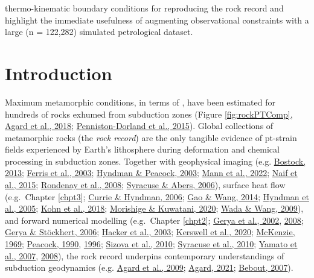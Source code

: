 thermo-kinematic boundary conditions for reproducing the rock record and highlight the immediate usefulness of augmenting observational constraints with a large (n = 122,282) simulated petrological dataset.

\hypertarget{chpt4Intro}{%
\section{Introduction}\label{chpt4Intro}}

Maximum metamorphic conditions, in terms of , have been estimated for hundreds of  rocks exhumed from subduction zones (Figure \ref{fig:rockPTComp}, \protect\hyperlink{ref-agard2018}{Agard et al., 2018}; \protect\hyperlink{ref-penniston2015}{Penniston-Dorland et al., 2015}). Global collections of metamorphic rocks (the \emph{rock record}) are the only tangible evidence of \gls{pt}-strain fields experienced by Earth's lithosphere during deformation and chemical processing in subduction zones. Together with geophysical imaging (e.g. \protect\hyperlink{ref-bostock2013}{Bostock, 2013}; \protect\hyperlink{ref-ferris2003}{Ferris et al., 2003}; \protect\hyperlink{ref-hyndman2003}{Hyndman \& Peacock, 2003}; \protect\hyperlink{ref-mann2022}{Mann et al., 2022}; \protect\hyperlink{ref-naif2015}{Naif et al., 2015}; \protect\hyperlink{ref-rondenay2008}{Rondenay et al., 2008}; \protect\hyperlink{ref-syracuse2006}{Syracuse \& Abers, 2006}), surface heat flow (e.g.~Chapter \ref{chpt3}; \protect\hyperlink{ref-currie2006}{Currie \& Hyndman, 2006}; \protect\hyperlink{ref-gao2014}{Gao \& Wang, 2014}; \protect\hyperlink{ref-hyndman2005}{Hyndman et al., 2005}; \protect\hyperlink{ref-kohn2018}{Kohn et al., 2018}; \protect\hyperlink{ref-morishige2020}{Morishige \& Kuwatani, 2020}; \protect\hyperlink{ref-wada2009}{Wada \& Wang, 2009}), and forward numerical modelling (e.g.~Chapter \ref{chpt2}; \protect\hyperlink{ref-gerya2002}{Gerya et al., 2002}, \protect\hyperlink{ref-gerya2008}{2008}; \protect\hyperlink{ref-gerya2006}{Gerya \& Stöckhert, 2006}; \protect\hyperlink{ref-hacker2003}{Hacker et al., 2003}; \protect\hyperlink{ref-kerswell2020}{Kerswell et al., 2020}; \protect\hyperlink{ref-mckenzie1969}{McKenzie, 1969}; \protect\hyperlink{ref-peacock1990}{Peacock, 1990}, \protect\hyperlink{ref-peacock1996}{1996}; \protect\hyperlink{ref-sizova2010}{Sizova et al., 2010}; \protect\hyperlink{ref-syracuse2010}{Syracuse et al., 2010}; \protect\hyperlink{ref-yamato2007}{Yamato et al., 2007}, \protect\hyperlink{ref-yamato2008}{2008}), the rock record underpins contemporary understandings of subduction geodynamics (e.g. \protect\hyperlink{ref-agard2009}{Agard et al., 2009}; \protect\hyperlink{ref-agard2021}{Agard, 2021}; \protect\hyperlink{ref-bebout2007}{Bebout, 2007}).




